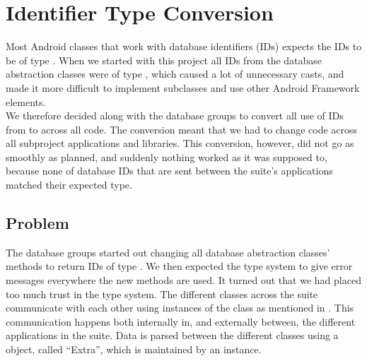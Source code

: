 \section{Identifier Type Conversion} %
\label{sec:identifier_type_conversion}


Most Android classes that work with database identifiers (IDs) expects the IDs to be of type . When we started with this project all IDs from the database abstraction classes were of type , which caused a lot of unnecessary casts, and made it more difficult to implement  subclasses and use other Android Framework elements.\\

We therefore decided along with the database groups to convert all use of IDs from  to  across all code. The conversion meant that we had to change code across all subproject applications and libraries. This conversion, however, did not go as smoothly as planned, and suddenly nothing worked as it was supposed to, because none of database IDs that are sent between the \giraf suite's applications matched their expected type. \\

\subsection{Problem}
The database groups started out changing all database abstraction classes'  methods to return IDs of type . We then expected the type system to give error messages everywhere the new  methods are used. It turned out that we had placed too much trust in the type system. The different  classes across the \giraf suite communicate with each other using instances of the  class as mentioned in . This communication happens both internally in, and externally between, the different applications in the \giraf suite. Data is parsed between the different  classes using a  object, called ``Extra'', which is maintained by an  instance. \\

